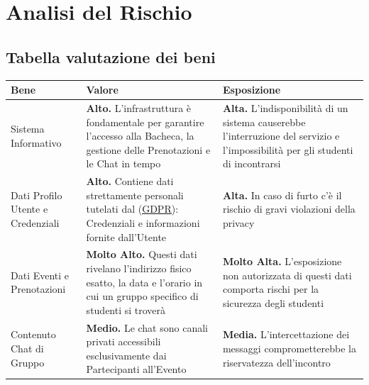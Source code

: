 \documentclass[12pt,a4paper]{report}
\let\oldhref\href
\renewcommand{\href}[2]{\oldhref{#1}{\uline{#2}}}
\begin{document}
\newpage
\section{Analisi del Rischio}

\subsection{Tabella valutazione dei beni}
\begin{tabularx}{\textwidth}{|p{3.8cm}|X|X|}
    \hline
    \rowcolor{studyColor} \textbf{Bene} & \textbf{Valore} & \textbf{Esposizione} \\ \hline
    \endhead
    Sistema Informativo & \textbf{Alto.} L'infrastruttura è fondamentale per garantire l'accesso alla Bacheca, la gestione delle Prenotazioni e le Chat in tempo
        & \textbf{Alta.} L'indisponibilità di un sistema causerebbe l'interruzione del servizio e l'impossibilità per gli studenti di incontrarsi \\ \hline
    Dati Profilo Utente e Credenziali & \textbf{Alto.} Contiene dati strettamente personali tutelati dal (\href{https://gdpr-info.eu/}{GDPR}): Credenziali e informazioni fornite dall'Utente 
        & \textbf{Alta.} In caso di furto c'è il rischio di gravi violazioni della privacy \\ \hline
    Dati Eventi e Prenotazioni & \textbf{Molto Alto.} Questi dati rivelano l'indirizzo fisico esatto, la data e l'orario in cui un gruppo specifico di studenti si troverà
        & \textbf{Molto Alta.} L'esposizione non autorizzata di questi dati comporta rischi per la sicurezza degli studenti \\ \hline
    Contenuto Chat di Gruppo & \textbf{Medio.} Le chat sono canali privati accessibili esclusivamente dai Partecipanti all'Evento 
        & \textbf{Media.} L'intercettazione dei messaggi comprometterebbe la riservatezza dell'incontro\\ \hline
\end{tabularx}
\end{document}
